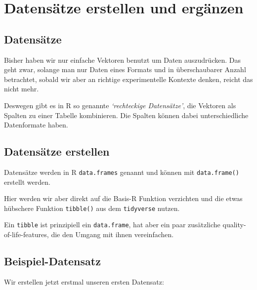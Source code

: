 \documentclass[
]{book}
\begin{document}
\hypertarget{datensuxe4tze-erstellen-und-erguxe4nzen}{%
\section{Datensätze erstellen und ergänzen}\label{datensuxe4tze-erstellen-und-erguxe4nzen}}

\hypertarget{datensuxe4tze}{%
\subsection{Datensätze}\label{datensuxe4tze}}

Bisher haben wir nur einfache Vektoren benutzt um Daten auszudrücken. Das geht zwar, solange man nur Daten eines Formats und in überschaubarer Anzahl betrachtet, sobald wir aber an richtige experimentelle Kontexte denken, reicht das nicht mehr.

Deswegen gibt es in R so genannte \emph{`rechteckige Datensätze'}, die Vektoren als Spalten zu einer Tabelle kombinieren. Die Spalten können dabei unterschiedliche Datenformate haben.

\hypertarget{datensuxe4tze-erstellen}{%
\subsection{Datensätze erstellen}\label{datensuxe4tze-erstellen}}

Datensätze werden in R \texttt{data.frames} genannt und können mit \texttt{data.frame()} erstellt werden.

Hier werden wir aber direkt auf die Basis-R Funktion verzichten und die etwas hübschere Funktion \texttt{tibble()} aus dem \texttt{tidyverse} nutzen.

Ein \texttt{tibble} ist prinzipiell ein \texttt{data.frame}, hat aber ein paar zusätzliche quality-of-life-features, die den Umgang mit ihnen vereinfachen.

\hypertarget{beispiel-datensatz}{%
\subsection{Beispiel-Datensatz}\label{beispiel-datensatz}}

Wir erstellen jetzt erstmal unseren ersten Datensatz:
\end{document}
